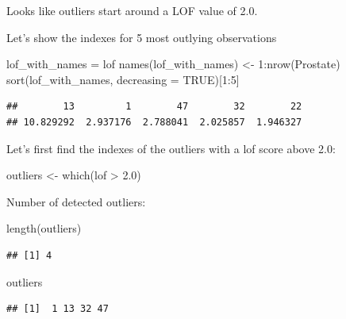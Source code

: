 \documentclass[
]{article}
\newenvironment{Shaded}{\begin{snugshade}}{\end{snugshade}}
\newcommand{\AttributeTok}[1]{\textcolor[rgb]{0.77,0.63,0.00}{#1}}
\newcommand{\ConstantTok}[1]{\textcolor[rgb]{0.00,0.00,0.00}{#1}}
\newcommand{\DecValTok}[1]{\textcolor[rgb]{0.00,0.00,0.81}{#1}}
\newcommand{\FloatTok}[1]{\textcolor[rgb]{0.00,0.00,0.81}{#1}}
\newcommand{\FunctionTok}[1]{\textcolor[rgb]{0.00,0.00,0.00}{#1}}
\newcommand{\NormalTok}[1]{#1}
\newcommand{\OtherTok}[1]{\textcolor[rgb]{0.56,0.35,0.01}{#1}}
\newcommand{\SpecialCharTok}[1]{\textcolor[rgb]{0.00,0.00,0.00}{#1}}
\begin{document}
Looks like outliers start around a LOF value of 2.0.

Let's show the indexes for 5 most outlying observations

\begin{Shaded}
\begin{Highlighting}[]
\NormalTok{lof\_with\_names }\OtherTok{=}\NormalTok{ lof}
\FunctionTok{names}\NormalTok{(lof\_with\_names) }\OtherTok{\textless{}{-}} \DecValTok{1}\SpecialCharTok{:}\FunctionTok{nrow}\NormalTok{(Prostate)}
\FunctionTok{sort}\NormalTok{(lof\_with\_names, }\AttributeTok{decreasing =} \ConstantTok{TRUE}\NormalTok{)[}\DecValTok{1}\SpecialCharTok{:}\DecValTok{5}\NormalTok{]}
\end{Highlighting}
\end{Shaded}

\begin{verbatim}
##        13         1        47        32        22 
## 10.829292  2.937176  2.788041  2.025857  1.946327
\end{verbatim}

Let's first find the indexes of the outliers with a lof score above 2.0:

\begin{Shaded}
\begin{Highlighting}[]
\NormalTok{outliers }\OtherTok{\textless{}{-}} \FunctionTok{which}\NormalTok{(lof }\SpecialCharTok{\textgreater{}} \FloatTok{2.0}\NormalTok{)}
\end{Highlighting}
\end{Shaded}

Number of detected outliers:

\begin{Shaded}
\begin{Highlighting}[]
\FunctionTok{length}\NormalTok{(outliers)}
\end{Highlighting}
\end{Shaded}

\begin{verbatim}
## [1] 4
\end{verbatim}

\begin{Shaded}
\begin{Highlighting}[]
\NormalTok{outliers}
\end{Highlighting}
\end{Shaded}

\begin{verbatim}
## [1]  1 13 32 47
\end{verbatim}
\end{document}
